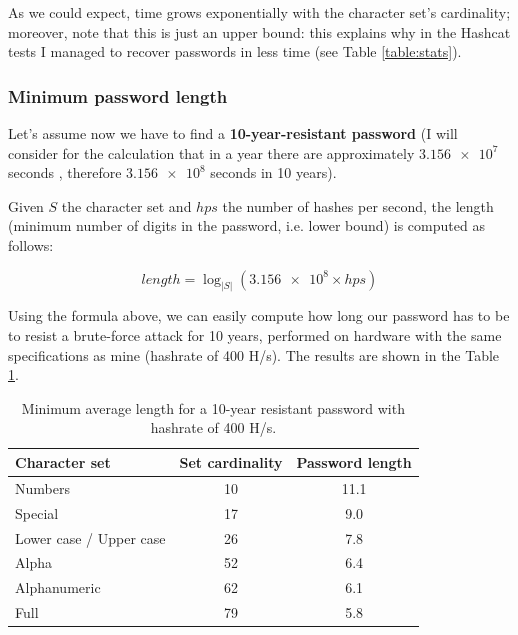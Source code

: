\documentclass[12pt]{article}
\begin{document}
As we could expect, time grows exponentially with the character set's cardinality; moreover, note that this is just an upper bound: this explains why in the Hashcat tests I managed to recover passwords in less time (see Table \ref{table:stats}).

\subsubsection{Minimum password length}

Let's assume now we have to find a \textbf{10-year-resistant password} (I will consider for the calculation that in a year there are approximately $\num{3.156e7}$ seconds \cite{unit-converter}, therefore $\num{3.156e8}$ seconds in 10 years).

Given $S$ the character set and $hps$ the number of hashes per second, the length (minimum number of digits in the password, i.e. lower bound) is computed as follows:

\[length = \log_{|S|}{(\num{3.156e8} \times hps)}\] 

Using the formula above, we can easily compute how long our password has to be to resist a brute-force attack for 10 years, performed on hardware with the same specifications as mine (hashrate of 400 H/s). The results are shown in the Table \ref{table:10year}.

\begin{table}[!ht]
    \centering
    \begin{tabular}{lcc}
    \toprule
        \textbf{Character set} & \textbf{Set cardinality} & \textbf{Password length} \\ 
        \midrule
        Numbers & 10 & 11.1 \\
        Special & 17 & 9.0 \\ 
        Lower case / Upper case & 26 & 7.8 \\ 
        Alpha & 52 & 6.4 \\ 
        Alphanumeric & 62 & 6.1 \\
        Full & 79 & 5.8 \\
    \bottomrule
    \end{tabular}
    \caption{Minimum average length for a 10-year resistant password with hashrate of 400 H/s.}
    \label{table:10year}
\end{table}

\printbibliography[title={Sources}]
\end{document}
